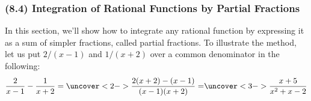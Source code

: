 \begin{frame}
\frametitle{(8.4) Integration of Rational Functions by Partial Fractions}
In this section, we'll show how to integrate any rational function by expressing it as a sum of simpler fractions, called partial fractions.  To illustrate the method, let us put $2/(x-1)$ and $1/(x+2)$ over a common denominator in the following:
\[
\frac{2}{x-1} - \frac{1}{x+2} = %
\uncover<2->{%
\frac{2(x+2) - (x-1)}{(x-1)(x+2)} = %
}%
\uncover<3->{%
\frac{x + 5}{x^2+x-2}%
}%
\]

%

\end{frame}
